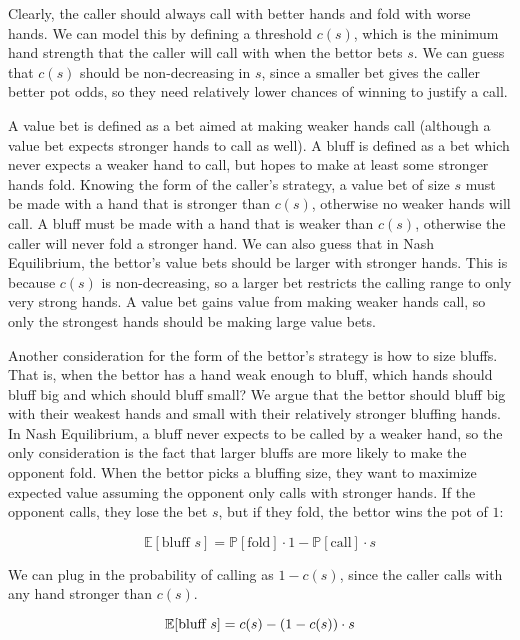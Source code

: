 \documentclass[../../main/main.tex]{subfiles}
\begin{document}
Clearly, the caller should always call with better hands and fold with worse hands.  We can model this by defining a threshold $c(s)$, which is the minimum hand strength that the caller will call with when the bettor bets $s$. We can guess that $c(s)$ should be non-decreasing in $s$, since a smaller bet gives the caller better pot odds, so they need relatively lower chances of winning to justify a call.

A value bet is defined as a bet aimed at making weaker hands call (although a value bet expects stronger hands to call as well). A bluff is defined as a bet which never expects a weaker hand to call, but hopes to make at least some stronger hands fold. Knowing the form of the caller's strategy, a value bet of size $s$ must be made with a hand that is stronger than $c(s)$, otherwise no weaker hands will call. A bluff must be made with a hand that is weaker than $c(s)$, otherwise the caller will never fold a stronger hand. We can also guess that in Nash Equilibrium, the bettor's value bets should be larger with stronger hands. This is because $c(s)$ is non-decreasing, so a larger bet restricts the calling range to only very strong hands. A value bet gains value from making weaker hands call, so only the strongest hands should be making large value bets. 

Another consideration for the form of the bettor's strategy is how to size bluffs. That is, when the bettor has a hand weak enough to bluff, which hands should bluff big and which should bluff small? We argue that the bettor should bluff big with their weakest hands and small with their relatively stronger bluffing hands. In Nash Equilibrium, a bluff never expects to be called by a weaker hand, so the only consideration is the fact that larger bluffs are more likely to make the opponent fold. When the bettor picks a bluffing size, they want to maximize expected value assuming the opponent only calls with stronger hands. If the opponent calls, they lose the bet $s$, but if they fold, the bettor wins the pot of $1$:

\[ \mathbb{E}[\text{bluff } s] = \mathbb{P}[\text{fold}] \cdot 1 -\mathbb{P}[\text{call}] \cdot s \]

We can plug in the probability of calling as $1-c(s)$, since the caller calls with any hand stronger than $c(s)$.

\begin{equation}{\label{eq:bluff}}
    \mathbb{E}[\text{bluff } s] = c(s) - (1-c(s)) \cdot s
\end{equation}
\end{document}
